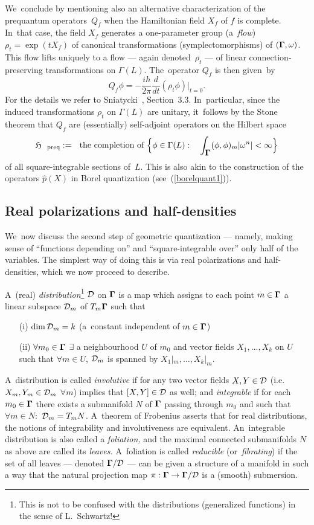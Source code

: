 \documentclass[12pt]{amsart}
\numberwithin{equation}{section}
\theoremstyle{remark}
\newcommand\into{\int_\Omg}
\newcommand\Omg{{\bigam}}   %
\newcommand\DD{{\Cal D}}
\newcommand\MD{{\Omg/\DD}}
\newcommand\HH{\mathfrak H}
\newcommand{\bigam}{\mbox{\boldmath $\Gamma$}}
\begin{document}
We~conclude by mentioning also an alternative characterization of the
prequantum operators~$Q_f$ when the Hamiltonian field $X_f$ of $f$ is complete.
In~that case, the field $X_f$ generates a one-parameter group (a~{\it flow\/})
$\rho_t=\exp(t X_f)$ of canonical transformations (symplectomorphisms) of
$(\Omg,\omega)$. This flow lifts uniquely to a flow --- again denoted~$\rho_t$
--- of linear connection-preserving transformations on $\Gamma(L)$.
The~operator $Q_f$ is then given~by
$$ Q_f \phi = -\frac{ih}{2\pi} \frac d{dt} (\rho_t\phi) \big|_{t=0}.  $$
For the details we refer to Sniatycki~\cite{bib:SniaB}, Section~3.3.
In~particular, since the induced transformations $\rho_t$ on $\Gamma(L)$ are
unitary, it~follows by the Stone theorem that $Q_f$ are (essentially)
self-adjoint operators on the Hilbert space
$$ \HH_{\text{preq}}:=\text{the completion of } \Big\{\phi\in\Gamma(L): \;
\text{$\into (\phi,\phi)_m |\omega^n| <\infty$}  \Big\}  $$
of all square-integrable sections of~$L$. This is also akin to the construction
of the operators $\widehat{p}(X)$ in Borel quantization
(see~(\ref{borelquant1})).



\subsection{Real polarizations and half-densities}\label{sec22}
We~now discuss the second step of geometric quantization --- namely, making
sense of ``functions depending on'' and ``square-integrable over'' only half of
the variables. The simplest way of doing this is via real polarizations and
half-densities, which we now proceed to describe.

A~(real) {\it distribution\/}\footnote{This is not to be confused with the
distributions (generalized functions) in the sense of L.~Schwartz!} $\DD$ on
$\Omg$ is a map which assigns to each point $m\in \Omg$ a linear subspace
$\DD_m$ of $T_m \Omg$ such that \begin{enumerate}
\item[(i)] $\dim\DD_m=k$ (a~constant independent of $m\in \Omg$)
\item[(ii)] $\forall m_0\in \Omg$ $\exists$ a neighbourhood $U$ of $m_0$ and
vector fields $X_1,\dots,X_k$ on $U$ such that $\forall m\in U$, $\DD_m$ is
spanned by $X_1|_m,\dots,X_k|_m$. \end{enumerate}
A~distribution is called {\it involutive\/} if for any two vector fields
$X,Y\in\DD$ (i.e.~$X_m,Y_m\in\DD_m$ $\forall m$) implies that $[X,Y]\in\DD$ as
well; and {\it integrable\/} if for each $m_0\in \Omg$ there exists a
submanifold $N$ of $\Omg$ passing through $m_0$ and such that $\forall m\in N:$
$\DD_m=T_m N$. A~theorem of Frobenius asserts that for real distributions, the
notions of integrability and involutiveness are equivalent. An~integrable
distribution is also called a {\it foliation,\/} and the maximal connected
submanifolds $N$ as above are called its {\it leaves.\/} A~foliation is called
{\it reducible\/} (or~{\it fibrating\/}) if the set of all leaves --- denoted
$\MD$ --- can be given a structure of a manifold in such a way that the natural
projection map $\pi:\Omg\to \MD$ is a (smooth) submersion.
\end{document}

